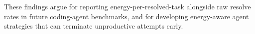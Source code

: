\documentclass[10pt,twocolumn]{article}
\begin{document}
These findings argue for reporting energy-per-resolved-task alongside
raw resolve rates in future coding-agent benchmarks, and for
developing energy-aware agent strategies that can terminate
unproductive attempts early.





% 
\end{document}
